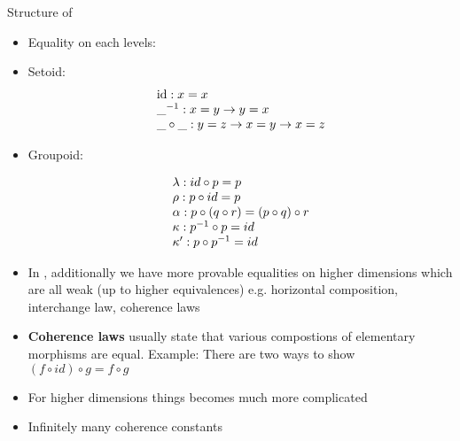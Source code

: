 \documentclass[12pt, mathserif,handout]{beamer}
\begin{document}
\begin{frame}[allowframebreaks,t]{Structure of \wog}

\begin{itemize}

\item Equality on each levels:


\item Setoid: 
\begin{equation*}
\begin{array}[b]{l} 
\text{id} : x = x \\
\_^{-1} : x= y \to y  = x \\
\_ \circ\_ : y = z \to x = y \to x = z
 \end{array}
\end{equation*}

\item Groupoid: 

\begin{equation*}
\begin{array}[b]{l}
\lambda : id \circ p = p \\
\rho : p \circ id = p \\
\alpha : p \circ (q \circ r) = (p \circ q) \circ r \\
\kappa : p^{-1}\circ p = id \\
\kappa' : p \circ p^{-1} = id
 \end{array}
\end{equation*}
\item In \wog, additionally we have more provable equalities on higher
  dimensions which are all weak (up to higher equivalences)
  e.g. horizontal composition, interchange law, coherence laws

 \item  \textbf{Coherence laws} usually state that various
   compostions of elementary morphisms are equal. Example: There are
   two ways to show $(f \circ id) \circ g = f \circ g$

\hspace{1cm}

\item For higher dimensions things becomes much more complicated

\item Infinitely many coherence constants
\end{itemize}

\end{frame}
\end{document}
